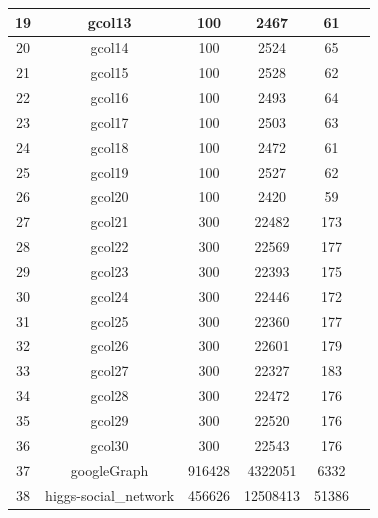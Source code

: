 \documentclass[MTech]{iitmdiss}
\begin{document}
\begin{table}[h]
\begin{tabular}{||c|c|c|c|c|c||}
\hline
19 & gcol13                  & 100     & 2467     & 61     & \cite{Beasley1990} \\
\hline
20 & gcol14                  & 100     & 2524     & 65     & \cite{Beasley1990} \\
\hline
21 & gcol15                  & 100     & 2528     & 62     & \cite{Beasley1990} \\
\hline
22 & gcol16                  & 100     & 2493     & 64     & \cite{Beasley1990} \\
\hline
23 & gcol17                  & 100     & 2503     & 63     & \cite{Beasley1990} \\
\hline
24 & gcol18                  & 100     & 2472     & 61     & \cite{Beasley1990} \\
\hline
25 & gcol19                  & 100     & 2527     & 62     & \cite{Beasley1990} \\
\hline
26 & gcol20                  & 100     & 2420     & 59     & \cite{Beasley1990} \\
\hline
27 & gcol21                  & 300     & 22482    & 173    & \cite{Beasley1990} \\
\hline
28 & gcol22                  & 300     & 22569    & 177    & \cite{Beasley1990} \\
\hline
29 & gcol23                  & 300     & 22393    & 175    & \cite{Beasley1990} \\
\hline
30 & gcol24                  & 300     & 22446    & 172    & \cite{Beasley1990} \\
\hline
31 & gcol25                  & 300     & 22360    & 177    & \cite{Beasley1990} \\
\hline
32 & gcol26                  & 300     & 22601    & 179    & \cite{Beasley1990} \\
\hline
33 & gcol27                  & 300     & 22327    & 183    & \cite{Beasley1990} \\
\hline
34 & gcol28                  & 300     & 22472    & 176    & \cite{Beasley1990} \\
\hline
35 & gcol29                  & 300     & 22520    & 176    & \cite{Beasley1990} \\
\hline
36 & gcol30                  & 300     & 22543    & 176    & \cite{Beasley1990} \\
\hline
37 & googleGraph             & 916428  & 4322051  & 6332   & \cite{snapnets}    \\
\hline
38 & higgs-social\_network    & 456626  & 12508413 & 51386  & \cite{snapnets}    \\

\end{tabular}
\end{table}
\end{document}
